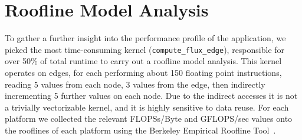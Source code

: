 \documentclass[runningheads]{llncs}
\begin{document}



\vspace{-10pt}
\section{Roofline Model Analysis}\label{sec/roof}
\vspace{-5pt}

\noindent To gather a further insight into the performance profile of the 
application, we picked the most time-consuming kernel 
(\texttt{compute\_flux\_edge}), responsible for over 50\% of total runtime to 
carry out a roofline model analysis. This kernel operates on edges, for each 
performing about 150 floating point instructions, reading 5 values from each 
node, 3 values from the edge, then indirectly incrementing 5 further values on 
each node. Due to the indirect accesses it is not a trivially vectorizable 
kernel, and it is highly sensitive to data reuse. For each platform we collected 
the relevant FLOPSs/Byte and GFLOPS/sec values onto the rooflines of each 
platform using the Berkeley Empirical Roofline Tool~\cite{lo2014roofline}.
\end{document}
